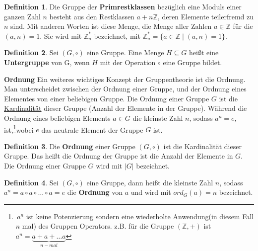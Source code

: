 \documentclass[12pt,oneside]{article}
\theoremstyle{remark}
\theoremstyle{definition}
\newtheorem{definition}{Definition}[section]
\begin{document}
\begin{definition}\label{mul-group}
Die Gruppe der \textbf{Primrestklassen} bezüglich eine Moduls einer ganzen Zahl $n$ besteht aus den Restklassen $a + n\mathbb{Z}$, deren Elemente teilerfremd zu $n$ sind. Mit anderen Worten ist diese Menge, die Menge aller Zahlen $a \in \mathbb{Z}$ für die $(a,n) = 1$. Sie wird mit $\mathbb{Z}_{n}^{*}$ bezeichnet, mit $\mathbb{Z}_{n}^{*} = \{ a \in \mathbb{Z} \mid (a,n) = 1 \}$.
\end{definition}

\smallskip

\begin{definition}
Sei $(G,\circ)$ eine Gruppe. Eine Menge $H \subseteq G$ heißt eine \textbf{Untergruppe} von G, wenn $H$ mit der Operation $\circ$ eine Gruppe bildet.
\end{definition}

\smallskip

\textbf{Ordnung}\newline
Ein weiteres wichtiges Konzept der Gruppentheorie ist die Ordnung. Man unterscheidet zwischen der Ordnung einer Gruppe, und der Ordnung eines Elementes von einer beliebigen Gruppe. Die Ordnung einer Gruppe $G$ ist die \href{https://en.wikipedia.org/wiki/Cardinality}{Kardinalität} dieser Gruppe (Anzahl der Elemente in der Gruppe). Während die Ordnung eines beliebigen Elements $a \in G$ die kleinste Zahl $n$, sodass $a^n =e$, ist,\footnote{$\, a^n$ ist keine Potenzierung sondern eine wiederholte Anwendung(in diesem Fall $n$ mal) des Gruppen Operators. z.B. für die Gruppe $(\mathbb{Z},+)$ ist $a^n = \underbrace{a + a + \dots a}_{n-mal}$}wobei $e$ das neutrale Element der Gruppe $G$ ist. 



\begin{definition}
Die \textbf{Ordnung} einer Gruppe $(G, \circ)$ ist die Kardinalität dieser Gruppe. Das heißt die Ordnung der Gruppe ist die Anzahl der Elemente in $G$. Die Ordnung einer Gruppe $G$ wird mit $|G|$ bezeichnet. 
\end{definition}

\begin{definition}
Sei $(G,\circ)$ eine Gruppe, dann heißt die kleinste Zahl $n$, sodass $a^n = a \circ a \circ \dots \circ a = e$ die \textbf{Ordnung} von $a$ und wird mit $ord_{G}(a) = n $ bezeichnet.
\end{definition}



\smallskip
\end{document}
